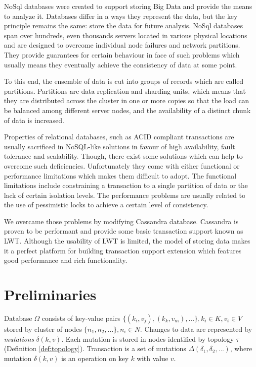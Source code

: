 \documentclass[runningheads,a4paper]{llncs}
\newcommand{\mutation}[2]{$\delta(#1, #2)$\xspace}
\begin{document}
NoSql databases were created to support storing Big Data and provide the means
to analyze it.  Databases differ in a ways they represent the data, but the key
principle remains the same:  store the data for future analysis. NoSql databases
span over hundreds, even thousands servers  located in various physical
locations and are designed to overcome individual node  failures and network
partitions. They provide guarantees for certain behaviour in face of such
problems which usually means they eventually achieve the consistency of data at
some point.

To this end, the ensemble of data is cut into groups of records which are called
partitions.  Partitions are data replication and sharding units, which means
that they are distributed across  the cluster in one or more copies so that the
load can be balanced among different server nodes, and the availability of a
distinct chunk of data is increased.

Properties of relational databases, such as ACID compliant transactions are
usually sacrificed in NoSQL-like solutions in favour of high availability, fault
tolerance and scalability. Though,  there exist some solutions which can help to
overcome such deficiencies. Unfortunately they come with either functional or
performance limitations which makes them difficult to adopt.  The functional
limitations include constraining a transaction to a single partition of data or
the lack of certain isolation levels. The performance problems are usually
related to the  use of pessimistic locks to achieve a certain level of
consistency.

We overcame those problems by modifying Cassandra database. Cassandra is proven
to be performant  and provide some basic transaction support known as LWT.
Although the usability of LWT is limited, the model of storing data makes it a
perfect platform for building transaction support extension which features good
performance and rich functionality.

\section{Preliminaries}

Database $\Omega$ consists of key-value pairs $\{(k_{i},v_{j}), (k_{k},v_{m}),...\}, k_i\in\mathit{K}, v_i\in\mathit{V}$ stored by cluster of nodes $\{n_1, n_2, ...\}, n_i\in\mathit{N}$.
Changes to data are represented by \emph{mutations} $\delta(k,v)$. 
Each mutation is stored in nodes identified by topology $\tau$ (Definition \ref{def:topology}).
Transaction is a set of mutations $\Delta(\delta_{1}, \delta_{2}, ...)$, where mutation \mutation{k}{v} is an operation
on key $k$ with value $v$.
\end{document}
